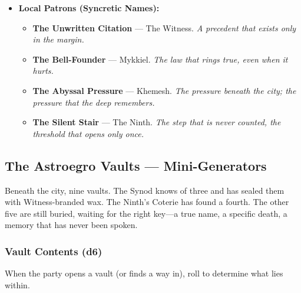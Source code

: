\begin{itemize}
\item \textbf{Local Patrons (Syncretic Names):}
  \begin{itemize}
    \item \textbf{The Unwritten Citation} --- The Witness. \textit{A precedent that exists only in the margin.}
    \item \textbf{The Bell-Founder} --- Mykkiel. \textit{The law that rings true, even when it hurts.}
    \item \textbf{The Abyssal Pressure} --- Khemesh. \textit{The pressure beneath the city; the pressure that the deep remembers.}
    \item \textbf{The Silent Stair} --- The Ninth. \textit{The step that is never counted, the threshold that opens only once.}
  \end{itemize}
\end{itemize}

\subsection*{The Astroegro Vaults --- Mini-Generators}
\label{sec:thepyrgos-vaults}

Beneath the city, nine vaults. The Synod knows of three and has sealed them with Witness-branded wax. The Ninth's Coterie has found a fourth. The other five are still buried, waiting for the right key---a true name, a specific death, a memory that has never been spoken.

\subsubsection*{Vault Contents (d6)}
When the party opens a vault (or finds a way in), roll to determine what lies within.

